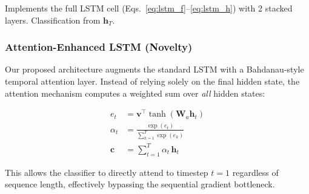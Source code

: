 \documentclass[12pt, a4paper]{article}
\begin{document}
Implements the full LSTM cell (Eqs.~\ref{eq:lstm_f}--\ref{eq:lstm_h}) with 2 stacked layers. Classification from $\mathbf{h}_T$.

\subsubsection{Attention-Enhanced LSTM (Novelty)}

Our proposed architecture augments the standard LSTM with a Bahdanau-style temporal attention layer. Instead of relying solely on the final hidden state, the attention mechanism computes a weighted sum over \textit{all} hidden states:

\begin{align}
    e_t &= \mathbf{v}^\top \tanh(\mathbf{W}_a \mathbf{h}_t) \label{eq:attn_score}\\
    \alpha_t &= \frac{\exp(e_t)}{\sum_{k=1}^{T} \exp(e_k)} \label{eq:attn_weight}\\
    \mathbf{c} &= \sum_{t=1}^{T} \alpha_t \, \mathbf{h}_t \label{eq:attn_context}
\end{align}

This allows the classifier to directly attend to timestep $t=1$ regardless of sequence length, effectively bypassing the sequential gradient bottleneck.
\end{document}
